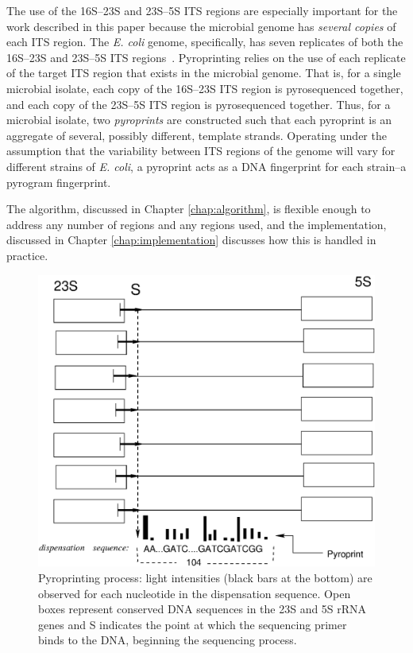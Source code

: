 \documentclass[12pt]{ucthesis}
\begin{document}
      The use of the 16S--23S and 23S--5S ITS regions are especially important
      for the work described in this paper because the microbial genome has
      \textit{several copies} of each ITS region. The \textit{E. coli} genome,
      specifically, has seven replicates of both the 16S--23S and 23S--5S ITS
      regions~\cite{Boyer:ITS, Roth:Phylo, Tyler:Primers}. Pyroprinting relies
      on the use of each replicate of the target ITS region that exists in the
      microbial genome. That is, for a single microbial isolate, each copy of
      the 16S--23S ITS region is pyrosequenced together, and each copy of the
      23S--5S ITS region is pyrosequenced together. Thus, for a microbial
      isolate, two \textit{pyroprints} are constructed such that each pyroprint is
      an aggregate of several, possibly different, template strands. Operating
      under the assumption that the variability between ITS regions of the
      genome will vary for different strains of \textit{E. coli}, a pyroprint
      acts as a DNA fingerprint for each strain--a pyrogram fingerprint.
      
      The algorithm, discussed in Chapter \ref{chap:algorithm}, is flexible
      enough to address any number of regions and any regions used, and the
      implementation, discussed in Chapter \ref{chap:implementation} discusses
      how this is handled in practice.

      \begin{figure}[t]
      \centering
      \includegraphics[width=\columnwidth]{graphics/pyroprinting.eps}
      \caption{Pyroprinting process: light intensities (black bars at the
               bottom) are observed for each nucleotide in the dispensation
               sequence. Open boxes represent conserved DNA sequences in the
               23S and 5S rRNA genes and \textnormal{S} indicates the point at
               which the sequencing primer binds to the DNA, beginning the
               sequencing process.}
      \label{fig:pyroprinting}
      \end{figure}
\end{document}
